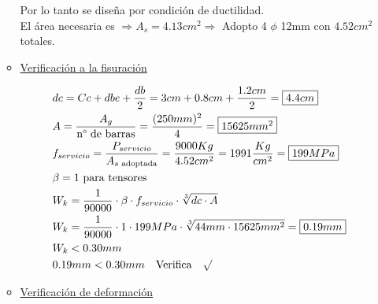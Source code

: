 \begin{enumerate}
\begin{itemize}
Por lo tanto se diseña por condición de ductilidad.\\
El área necesaria es $\Rightarrow A_s = 4.13 cm^2 \Rightarrow$ Adopto 4 $\phi$ 12mm con $4.52 cm^2$ totales.\\

\item \underline{Verificación a la fisuración}

\begin{align*}
& dc = Cc + dbe + \frac{db}{2} = 3cm + 0.8cm + \frac{1.2cm}{2} = \framebox{$4.4 cm$}\\
& A = \frac{A_g}{\text{n° de barras}} = \frac{(250mm)^2}{4} = \framebox{$15625 mm^2$}\\
& f_{servicio}= \frac{P_{servicio}}{A_{s \text{ adoptada}}} = \frac{9000Kg}{4.52 cm^2} = 1991 \frac{Kg}{cm^2} = \framebox{$199 MPa$}\\
& \beta = 1 \text{ para tensores}\\
& W_k = \frac{1}{90000} \cdot \beta \cdot f_{servicio} \cdot \sqrt[3]{dc \cdot A}\\
& W_k = \frac{1}{90000} \cdot 1 \cdot 199MPa \cdot \sqrt[3]{44mm \cdot 15625 mm^2} = \framebox{$0.19 mm$}\\
& W_k < 0.30 mm\\
& 0.19mm < 0.30mm \quad \text{Verifica} \quad \surd
\end{align*}

\newpage
\item \underline{Verificación de deformación}


\end{itemize}
\end{enumerate}
